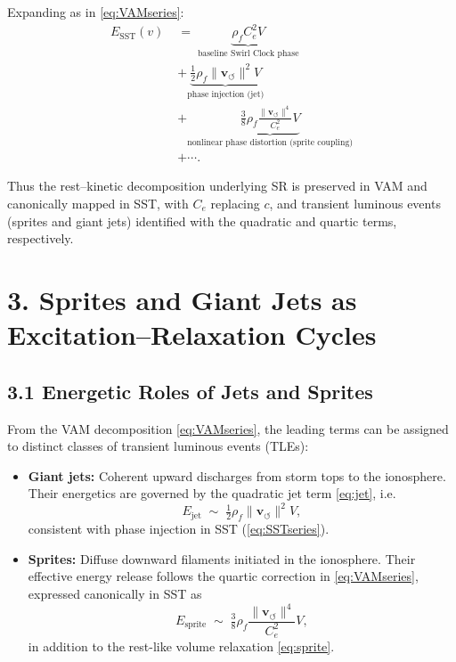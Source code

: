 \documentclass[11pt]{article}
\newcommand{\vnorm}{\lVert \mathbf{v}_{\!\boldsymbol{\circlearrowleft}}\rVert}
\newcommand{\rhof}{\rho_{\!f}}
\newcommand{\Ce}{C_{e}}
\begin{document}
    Expanding as in \eqref{eq:VAMseries}:
    \begin{align}
    E_{\text{SST}}(v) \;&=\;
    \underbrace{\rhof \Ce^2 V}_{\text{baseline Swirl Clock phase}} \nonumber\\
    &+ \underbrace{\tfrac{1}{2}\rhof \vnorm^2 V}_{\text{phase injection (jet)}} \nonumber\\
    &+ \underbrace{\tfrac{3}{8}\rhof \tfrac{\vnorm^4}{\Ce^2} V}_{\text{nonlinear phase distortion (sprite coupling)}} \nonumber\\
    &+ \cdots.
    \label{eq:SSTseries}
    \end{align}

    Thus the rest--kinetic decomposition underlying SR is preserved
    in VAM and canonically mapped in SST, with $\Ce$ replacing $c$,
    and transient luminous events (sprites and giant jets) identified
    with the quadratic and quartic terms, respectively.


\section*{3. Sprites and Giant Jets as Excitation--Relaxation Cycles}

\subsection*{3.1 Energetic Roles of Jets and Sprites}

    From the VAM decomposition \eqref{eq:VAMseries}, the leading terms can be assigned to distinct classes of transient luminous events (TLEs):

    \begin{itemize}
    \item \textbf{Giant jets:}
    Coherent upward discharges from storm tops to the ionosphere.
    Their energetics are governed by the quadratic jet term
    \eqref{eq:jet}, i.e.
    \[
        E_{\text{jet}} \;\sim\; \tfrac{1}{2}\rhof \vnorm^2 V,
    \]
    consistent with phase injection in SST (\eqref{eq:SSTseries}).

    \item \textbf{Sprites:}
    Diffuse downward filaments initiated in the ionosphere.
    Their effective energy release follows the quartic correction in
    \eqref{eq:VAMseries}, expressed canonically in SST as
    \[
        E_{\text{sprite}} \;\sim\; \tfrac{3}{8}\rhof \frac{\vnorm^4}{\Ce^2}V,
    \]
    in addition to the rest-like volume relaxation
    \eqref{eq:sprite}.
    \end{itemize}
\end{document}
